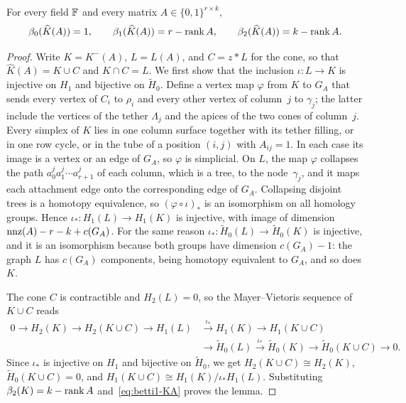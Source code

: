 \begin{lemma}\label{lem:coning}
For every field $\mathbb{F}$ and every matrix $A\in\{0,1\}^{r\times k}$,
\[
  \beta_0(\widehat K(A))=1,\qquad
  \beta_1(\widehat K(A))=r-\operatorname{rank} A,\qquad
  \beta_2(\widehat K(A))=k-\operatorname{rank} A .
\]
\end{lemma}

\begin{proof}
Write $K=K^-(A)$, $L=L(A)$, and $C=z\ast L$ for the cone, so that $\widehat K(A)=K\cup C$ and $K\cap C=L$.
We first show that the inclusion $\iota\colon L\to K$ is injective on $H_1$ and bijective on $\widetilde H_0$.
Define a vertex map $\varphi$ from $K$ to $G_A$ that sends every vertex of $C_i$ to $\rho_i$ and every other vertex of column~$j$ to $\gamma_j$; the latter include the vertices of the tether $\Lambda_j$ and the apices of the two cones of column~$j$.
Every simplex of $K$ lies in one column surface together with its tether filling, or in one row cycle, or in the tube of a position $(i,j)$ with $A_{ij}=1$.
In each case its image is a vertex or an edge of $G_A$, so $\varphi$ is simplicial.
On $L$, the map $\varphi$ collapses the path $a^j_0a^j_1\cdots a^j_{r+1}$ of each column, which is a tree, to the node~$\gamma_j$, and it maps each attachment edge onto the corresponding edge of $G_A$.
Collapsing disjoint trees is a homotopy equivalence, so $(\varphi\circ\iota)_*$ is an isomorphism on all homology groups.
Hence $\iota_*\colon H_1(L)\to H_1(K)$ is injective, with image of dimension $\operatorname{nnz}(A)-r-k+c(G_A)$.
For the same reason $\iota_*\colon\widetilde H_0(L)\to\widetilde H_0(K)$ is injective, and it is an isomorphism because both groups have dimension $c(G_A)-1$: the graph $L$ has $c(G_A)$ components, being homotopy equivalent to $G_A$, and so does $K$.

The cone $C$ is contractible and $H_2(L)=0$, so the Mayer--Vietoris sequence of $K\cup C$ reads
\begin{align*}
  0\to H_2(K)\to H_2(K\cup C)\to H_1(L)&\xrightarrow{\;\iota_*\;}H_1(K)\to H_1(K\cup C)\\
  &\to\widetilde H_0(L)\xrightarrow{\;\iota_*\;}\widetilde H_0(K)\to\widetilde H_0(K\cup C)\to0 .
\end{align*}
Since $\iota_*$ is injective on $H_1$ and bijective on $\widetilde H_0$, we get $H_2(K\cup C)\cong H_2(K)$, $\widetilde H_0(K\cup C)=0$, and $H_1(K\cup C)\cong H_1(K)/\iota_*H_1(L)$.
Substituting $\beta_2(K)=k-\operatorname{rank} A$ and~\eqref{eq:betti1-KA} proves the lemma.
\end{proof}

